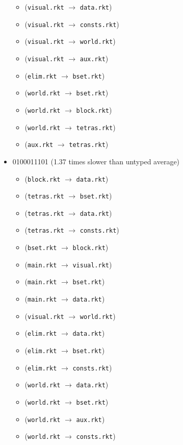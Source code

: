 \documentclass{article}
\newcommand{\mono}[1]{\texttt{#1}}
\begin{document}
\begin{itemize}
\begin{itemize}
  \item (\mono{visual.rkt} $\rightarrow$ \mono{data.rkt})
  \item (\mono{visual.rkt} $\rightarrow$ \mono{consts.rkt})
  \item (\mono{visual.rkt} $\rightarrow$ \mono{world.rkt})
  \item (\mono{visual.rkt} $\rightarrow$ \mono{aux.rkt})
  \item (\mono{elim.rkt} $\rightarrow$ \mono{bset.rkt})
  \item (\mono{world.rkt} $\rightarrow$ \mono{bset.rkt})
  \item (\mono{world.rkt} $\rightarrow$ \mono{block.rkt})
  \item (\mono{world.rkt} $\rightarrow$ \mono{tetras.rkt})
  \item (\mono{aux.rkt} $\rightarrow$ \mono{tetras.rkt})
  \end{itemize}
\item 0100011101 (1.37 times slower than untyped average)
  \begin{itemize}
  \item (\mono{block.rkt} $\rightarrow$ \mono{data.rkt})
  \item (\mono{tetras.rkt} $\rightarrow$ \mono{bset.rkt})
  \item (\mono{tetras.rkt} $\rightarrow$ \mono{data.rkt})
  \item (\mono{tetras.rkt} $\rightarrow$ \mono{consts.rkt})
  \item (\mono{bset.rkt} $\rightarrow$ \mono{block.rkt})
  \item (\mono{main.rkt} $\rightarrow$ \mono{visual.rkt})
  \item (\mono{main.rkt} $\rightarrow$ \mono{bset.rkt})
  \item (\mono{main.rkt} $\rightarrow$ \mono{data.rkt})
  \item (\mono{visual.rkt} $\rightarrow$ \mono{world.rkt})
  \item (\mono{elim.rkt} $\rightarrow$ \mono{data.rkt})
  \item (\mono{elim.rkt} $\rightarrow$ \mono{bset.rkt})
  \item (\mono{elim.rkt} $\rightarrow$ \mono{consts.rkt})
  \item (\mono{world.rkt} $\rightarrow$ \mono{data.rkt})
  \item (\mono{world.rkt} $\rightarrow$ \mono{bset.rkt})
  \item (\mono{world.rkt} $\rightarrow$ \mono{aux.rkt})
  \item (\mono{world.rkt} $\rightarrow$ \mono{consts.rkt})

\end{itemize}
\end{itemize}
\end{document}
